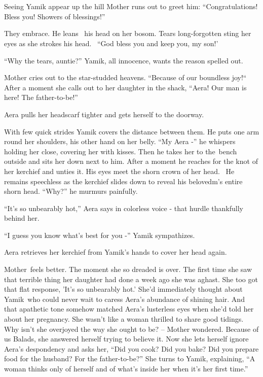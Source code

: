 \documentclass[twoside,11pt]{book}
\begin{document}
\chapter{}

Seeing Yamik appear up the hill Mother runs out to greet him: ``Congratulations! Bless you! Showers of
blessings!''

They embrace. He leans \ his head on her bosom. Tears long-forgotten sting her eyes as she strokes his head. \ {}``God
bless you and keep you, my son!'

``Why the tears, auntie?'' Yamik, all innocence, wants the reason spelled out.

Mother cries out to the star-studded heavens. ``Because of our boundless joy!``~ After a
moment she calls out to her daughter in the shack, ``Aera! Our man is here! The
father-to-be!''

Aera pulls her headscarf tighter and gets herself to the doorway.

With few quick strides Yamik covers the distance between them. He puts one arm round her shoulders, his other hand on
her belly. ``My Aera -'' he whispers holding her close, covering her with kisses. Then he
takes her to the~bench outside and sits her down next to him. After a moment he reaches for the knot of her kerchief
and unties it. His eyes meet the shorn crown of her head. \ He remains speechless as the kerchief slides down to reveal
his belovedm's entire shorn head. ``Why?'' he murmurs painfully.

``It's so unbearably hot,'' Aera says in colorless voice - that hurdle thankfully behind her.

``I guess you know what's best for you -'' Yamik sympathizes.

Aera retrieves her kerchief from Yamik's hands to cover her head again.

Mother~feels better. The moment she so dreaded is over. The first time she saw that terrible thing her daughter had done
a week ago she was aghast. She too got that flat response, 'It's so unbearably hot.' She'd immediately thought about
Yamik~who could never wait to caress Aera's abundance of shining hair. And that apathetic tone somehow matched Aera's
lusterless eyes when she'd told her about her pregnancy. She wasn't like a woman thrilled to share good tidings. Why
isn't she overjoyed the way she ought to be? -- Mother wondered. Because of us Balads, she answered herself trying to
believe it. Now she lets herself ignore Aera's despondency and asks her, ``Did you cook? Did you bake? Did
you prepare food for the husband? For the father-to-be?'' She turns to Yamik, explaining, ``A
woman thinks only of herself and of what's inside her when it's her first time.''
\end{document}
